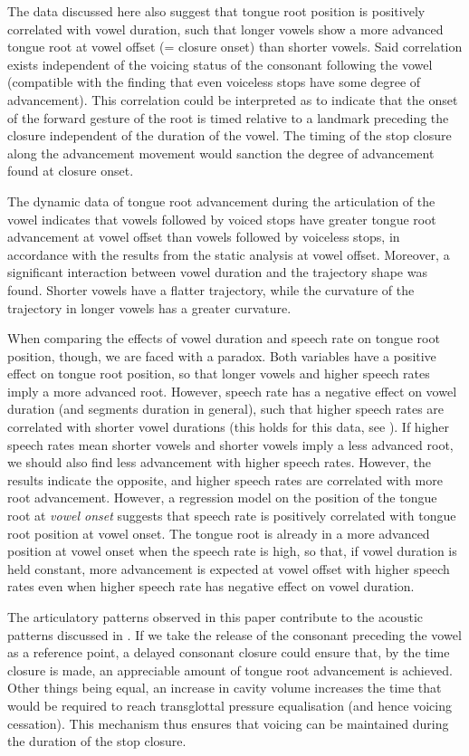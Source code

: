 \documentclass[12pt,]{article}
\begin{document}
The data discussed here also suggest that tongue root position is
positively correlated with vowel duration, such that longer vowels show
a more advanced tongue root at vowel offset (= closure onset) than
shorter vowels. Said correlation exists independent of the voicing
status of the consonant following the vowel (compatible with the finding
that even voiceless stops have some degree of advancement). This
correlation could be interpreted as to indicate that the onset of the
forward gesture of the root is timed relative to a landmark preceding
the closure independent of the duration of the vowel. The timing of the
stop closure along the advancement movement would sanction the degree of
advancement found at closure onset.

The dynamic data of tongue root advancement during the articulation of
the vowel indicates that vowels followed by voiced stops have greater
tongue root advancement at vowel offset than vowels followed by
voiceless stops, in accordance with the results from the static analysis
at vowel offset. Moreover, a significant interaction between vowel
duration and the trajectory shape was found. Shorter vowels have a
flatter trajectory, while the curvature of the trajectory in longer
vowels has a greater curvature.

When comparing the effects of vowel duration and speech rate on tongue
root position, though, we are faced with a paradox. Both variables have
a positive effect on tongue root position, so that longer vowels and
higher speech rates imply a more advanced root. However, speech rate has
a negative effect on vowel duration (and segments duration in general),
such that higher speech rates are correlated with shorter vowel
durations (this holds for this data, see \citealt{coretta2018j}). If
higher speech rates mean shorter vowels and shorter vowels imply a less
advanced root, we should also find less advancement with higher speech
rates. However, the results indicate the opposite, and higher speech
rates are correlated with more root advancement. However, a regression
model on the position of the tongue root at \emph{vowel onset} suggests
that speech rate is positively correlated with tongue root position at
vowel onset. The tongue root is already in a more advanced position at
vowel onset when the speech rate is high, so that, if vowel duration is
held constant, more advancement is expected at vowel offset with higher
speech rates even when higher speech rate has negative effect on vowel
duration.

The articulatory patterns observed in this paper contribute to the
acoustic patterns discussed in \citet{coretta2018j}. If we take the
release of the consonant preceding the vowel as a reference point, a
delayed consonant closure could ensure that, by the time closure is
made, an appreciable amount of tongue root advancement is achieved.
Other things being equal, an increase in cavity volume increases the
time that would be required to reach transglottal pressure equalisation
(and hence voicing cessation). This mechanism thus ensures that voicing
can be maintained during the duration of the stop closure.
\end{document}
